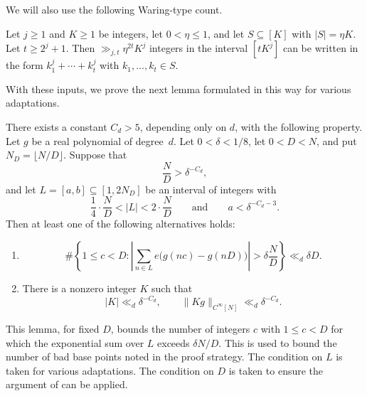We will also use the following Waring-type count.
\begin{lemma}
\label{lem:gt-waring}
Let \(j\ge 1\) and \(K\ge 1\) be integers, let \(0<\eta\le 1\), and let
\(S\subseteq[K]\) with \(|S|=\eta K\).  Let \(t\ge 2^j+1\).  Then
\(\gg_{j,t}\eta^{2t}K^j\) integers in the interval \([tK^j]\) can be written
in the form \(k_1^j+\cdots+k_t^j\) with \(k_1,\ldots,k_t\in S\).
\end{lemma}

With these inputs, we prove the next lemma formulated in this way for various adaptations.
\begin{lemma}\label{lem:diophantine-nil}
There exists a constant $C_d>5$, depending only on $d$, with the
following property. Let $g$ be a real polynomial of degree~$d$. Let $0<\delta<1/8$, let $0<D<N$, and put
$N_D=\lfloor N/D\rfloor$. Suppose that
\[
\frac ND>\delta^{-C_d},
\]
and let $L=[a,b]\subseteq[1,2N_D]$ be an interval of integers with
\[
\frac14\cdot\frac ND<|L|<2\cdot\frac ND
\qquad\text{and}\qquad
a<\delta^{-C_d-3}.
\]
Then at least one of the following alternatives holds:
\begin{enumerate}
    \item
    \[
    \#\left\{1\leq c<D:
    \left|\sum_{n\in L}e\bigl(g(nc)-g(nD)\bigr)\right|
    >\delta\frac ND\right\}\ll_d\delta D.
    \]
    \item There is a nonzero integer $K$ such that
    \[
    |K|\ll_d\delta^{-C_d},\qquad
    \|Kg\|_{C^\infty[N]}\ll_d\delta^{-C_d}.
    \]
\end{enumerate}
\end{lemma}
This lemma, for fixed $D$, bounds the number of integers $c$ with $1\le c<D$ for which the exponential sum over $L$ exceeds $\delta N/D$. This is used to bound the number of bad base points noted in the proof strategy.
The condition on $L$ is taken for various adaptations.
The condition on $D$ is taken to ensure the argument
of \cite[\S3]{GTmob} can be applied.
